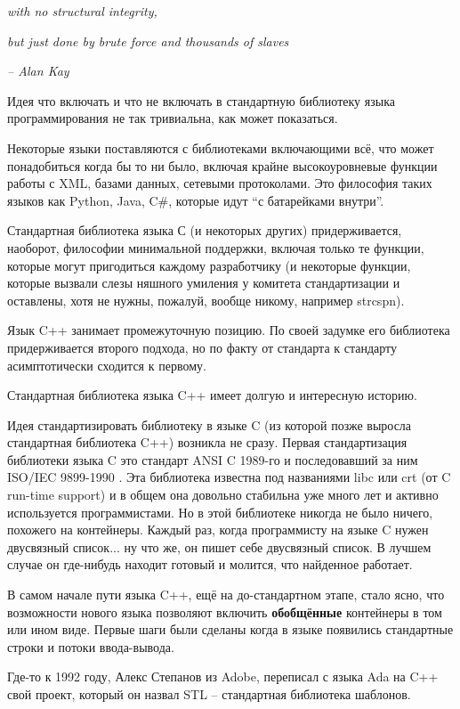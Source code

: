 \documentclass[a4paper,12pt,oneside]{article}
\begin{document}
\hfill\textit{with no structural integrity,}

\hfill\textit{but just done by brute force and thousands of slaves}{\vspace{0.5em}}

\hfill\textit{-- Alan Kay}

Идея что включать и что не включать в стандартную библиотеку языка программирования не так тривиальна, как может показаться.

Некоторые языки поставляются с библиотеками включающими всё, что может понадобиться когда бы то ни было, включая крайне высокоуровневые функции работы с XML, базами данных, сетевыми протоколами. Это философия таких языков как Python, Java, C\#, которые идут ``с батарейками внутри''.

Стандартная библиотека языка С (и некоторых других) придерживается, наоборот, философии минимальной поддержки, включая только те функции, которые могут пригодиться каждому разработчику (и некоторые функции, которые вызвали слезы няшного умиления у комитета стандартизации и оставлены, хотя не нужны, пожалуй, вообще никому, например strcspn).

Язык C++ занимает промежуточную позицию. По своей задумке его библиотека придерживается второго подхода, но по факту от стандарта к стандарту асимптотически сходится к первому.

Стандартная библиотека языка C++ имеет долгую и интересную историю. 

Идея стандартизировать библиотеку в языке C (из которой позже выросла стандартная библиотека C++) возникла не сразу. Первая стандартизация библиотеки языка C это стандарт ANSI C 1989-го и последовавший за ним ISO/IEC 9899-1990 \cite{stdc90}. Эта библиотека известна под названиями libc или crt (от C run-time support) и в общем она довольно стабильна уже много лет и активно используется программистами. Но в этой библиотеке никогда не было ничего, похожего на контейнеры. Каждый раз, когда программисту на языке C нужен двусвязный список... ну что же, он пишет себе двусвязный список. В лучшем случае он где-нибудь находит готовый и молится, что найденное работает.

В самом начале пути языка C++, ещё на до-стандартном этапе, стало ясно, что возможности нового языка позволяют включить \textbf{обобщённые} контейнеры в том или ином виде. Первые шаги были сделаны когда в языке появились стандартные строки и потоки ввода-вывода.

Где-то к 1992 году, Алекс Степанов из Adobe, переписал с языка Ada на C++ свой проект, который он назвал STL -- стандартная библиотека шаблонов.
\end{document}
